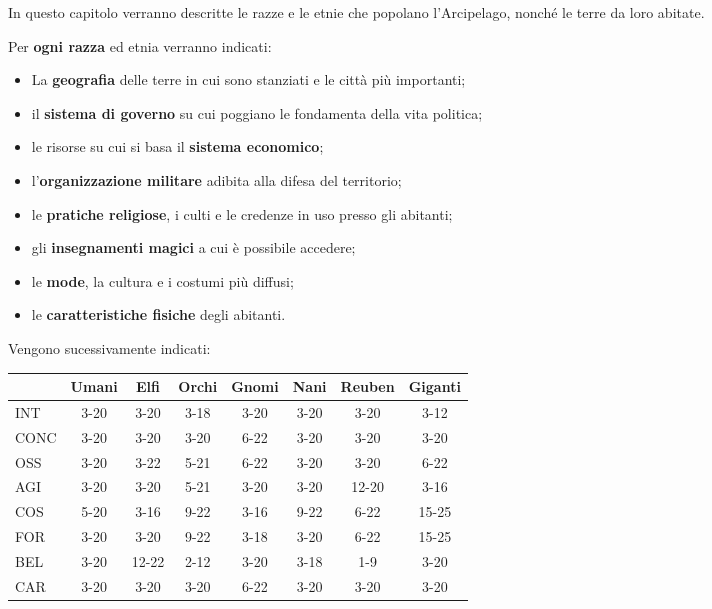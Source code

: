 In questo capitolo verranno descritte le razze e le etnie che popolano l'Arcipelago,
nonch\'e le terre da loro abitate.

Per \textbf{ogni razza} ed etnia verranno indicati:
\begin{itemize}\itemsep -3pt
\item La \textbf{geografia} delle terre in cui sono stanziati e le citt\`a
  pi\`u importanti;
\item il \textbf{sistema di governo} su cui poggiano le fondamenta della vita
  politica;
\item le risorse su cui si basa il \textbf{sistema economico};
\item l'\textbf{organizzazione militare} adibita alla difesa del
  territorio;
\item le \textbf{pratiche religiose}, i culti e le credenze in uso presso gli
  abitanti;
\item gli \textbf{insegnamenti magici} a cui \`e possibile accedere;
\item le \textbf{mode}, la cultura e i costumi pi\`u diffusi;
\item le \textbf{caratteristiche fisiche} degli abitanti.

\end{itemize}

Vengono sucessivamente indicati:

\iffullversion
\begin{table*}[hbt]
  \begin{center}\Large
    \begin{tabular}{|l|c|c|c|c|c|c|c|} \hline
            & Umani & Elfi & Orchi & Gnomi & Nani & Reuben & Giganti \\ \hline\hline
      INT   & 3-20  & 3-20 & 3-18  & 3-20  & 3-20 & 3-20   & 3-12 \\ \hline
      CONC  & 3-20  & 3-20 & 3-20  & 6-22  & 3-20 & 3-20   & 3-20 \\ \hline
      OSS   & 3-20  & 3-22 & 5-21  & 6-22  & 3-20 & 3-20   & 6-22 \\ \hline
      AGI   & 3-20  & 3-20 & 5-21  & 3-20  & 3-20 &12-20   & 3-16 \\ \hline
      COS   & 5-20  & 3-16 & 9-22  & 3-16  & 9-22 & 6-22   &15-25 \\ \hline
      FOR   & 3-20  & 3-20 & 9-22  & 3-18  & 3-20 & 6-22   &15-25 \\ \hline
      BEL   & 3-20  &12-22 & 2-12  & 3-20  & 3-18 & 1-9    & 3-20 \\ \hline
      CAR   & 3-20  & 3-20 & 3-20  & 6-22  & 3-20 & 3-20   & 3-20 \\ \hline
    \end{tabular}
  \end{center}
  \caption{Tabella comparativa minimi e massimi per le Caratteristiche}
\end{table*}
\fi  

